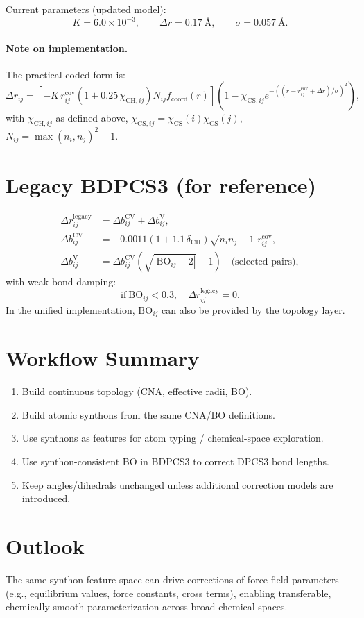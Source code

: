 \documentclass[a4paper,11pt]{article}
\begin{document}
Current parameters (updated model):
\begin{equation}
K=6.0\times10^{-3},\qquad
\Delta r=0.17~\text{\AA},\qquad
\sigma=0.057~\text{\AA}.
\end{equation}

\paragraph{Note on implementation.}
The practical coded form is:
\begin{equation}
\Delta r_{ij}
=\left[-K\,r^{\mathrm{cov}}_{ij}(1+0.25\,\chi_{\mathrm{CH},ij})N_{ij}f_{\mathrm{coord}}(r)\right]
\left(1-\chi_{\mathrm{CS},ij}e^{-((r-r^{\mathrm{cov}}_{ij}+\Delta r)/\sigma)^2}\right),
\end{equation}
with $\chi_{\mathrm{CH},ij}$ as defined above,
$\chi_{\mathrm{CS},ij}=\chi_{\mathrm{CS}}(i)\chi_{\mathrm{CS}}(j)$,
$N_{ij}=\max(n_i,n_j)^2-1$.

\section{Legacy BDPCS3 (for reference)}
\begin{align}
\Delta r^{\mathrm{legacy}}_{ij} &= \Delta b^{\mathrm{CV}}_{ij}+\Delta b^{\mathrm{V}}_{ij},\\
\Delta b^{\mathrm{CV}}_{ij}
&= -0.0011\left(1+1.1\,\delta_{\mathrm{CH}}\right)\sqrt{n_i n_j-1}\;r^{\mathrm{cov}}_{ij},\\
\Delta b^{\mathrm{V}}_{ij}
&= \Delta b^{\mathrm{CV}}_{ij}\left(\sqrt{|\mathrm{BO}_{ij}-2|}-1\right)
\quad\text{(selected pairs)},
\end{align}
with weak-bond damping:
\begin{equation}
\mathrm{if}\ \mathrm{BO}_{ij}<0.3,\quad \Delta r^{\mathrm{legacy}}_{ij}=0.
\end{equation}
In the unified implementation, $\mathrm{BO}_{ij}$ can also be provided by the topology layer.

\section{Workflow Summary}
\begin{enumerate}
\item Build continuous topology (CNA, effective radii, BO).
\item Build atomic synthons from the same CNA/BO definitions.
\item Use synthons as features for atom typing / chemical-space exploration.
\item Use synthon-consistent BO in BDPCS3 to correct DPCS3 bond lengths.
\item Keep angles/dihedrals unchanged unless additional correction models are introduced.
\end{enumerate}

\section{Outlook}
The same synthon feature space can drive corrections of force-field parameters
(e.g., equilibrium values, force constants, cross terms), enabling transferable,
chemically smooth parameterization across broad chemical spaces.
\end{document}
